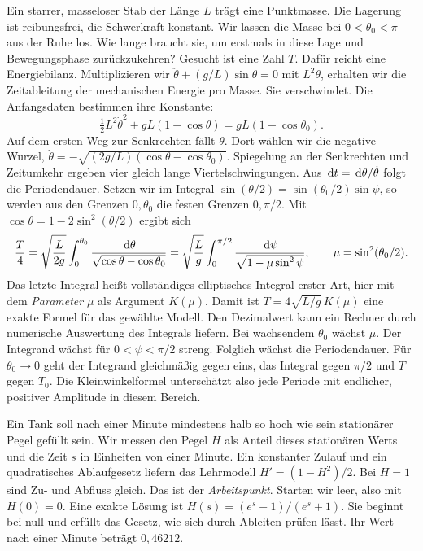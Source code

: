 Ein starrer, masseloser Stab der Länge \(L\) trägt eine Punktmasse. Die Lagerung ist reibungsfrei, die Schwerkraft konstant. Wir lassen die Masse bei \(0<\theta_0<\pi\) aus der Ruhe los. Wie lange braucht sie, um erstmals in diese Lage und Bewegungsphase zurückzukehren? Gesucht ist eine Zahl \(T\). Dafür reicht eine Energiebilanz.
Multiplizieren wir \(\ddot\theta+(g/L)\sin\theta=0\) mit \(L^2\dot\theta\), erhalten wir die Zeitableitung der mechanischen Energie pro Masse. Sie verschwindet. Die Anfangsdaten bestimmen ihre Konstante:
\[
 \tfrac12 L^2\dot\theta^2+gL(1-\cos\theta)=gL(1-\cos\theta_0).
\]
Auf dem ersten Weg zur Senkrechten fällt \(\theta\). Dort wählen wir die negative Wurzel, \(\dot\theta=-\sqrt{(2g/L)(\cos\theta-\cos\theta_0)}\). Spiegelung an der Senkrechten und Zeitumkehr ergeben vier gleich lange Viertelschwingungen.
Aus \(\,\mathrm{d} t=\,\mathrm{d}\theta/\dot\theta\) folgt die Periodendauer. Setzen wir im Integral \(\sin(\theta/2)=\sin(\theta_0/2)\sin\psi\), so werden aus den Grenzen \(0,\theta_0\) die festen Grenzen \(0,\pi/2\). Mit \(\cos\theta=1-2\sin^2(\theta/2)\) ergibt sich
\[
 \frac{T}{4}=\sqrt{\frac{L}{2g}}\int_0^{\theta_0}
 \frac{\,\mathrm{d}\theta}{\sqrt{\cos\theta-\cos\theta_0}}
 =\sqrt{\frac{L}{g}}\int_0^{\pi/2}\frac{\,\mathrm{d}\psi}{\sqrt{1-\mu\sin^2\psi}},
 \qquad \mu=\sin^2(\theta_0/2).
\]
Das letzte Integral heißt vollständiges elliptisches Integral erster Art, hier mit dem \emph{Parameter} \(\mu\) als Argument \(K(\mu)\). Damit ist \(T=4\sqrt{L/g}\,K(\mu)\) eine exakte Formel für das gewählte Modell. Den Dezimalwert kann ein Rechner durch numerische Auswertung des Integrals liefern.
Bei wachsendem \(\theta_0\) wächst \(\mu\). Der Integrand wächst für \(0<\psi<\pi/2\) streng. Folglich wächst die Periodendauer. Für \(\theta_0\to0\) geht der Integrand gleichmäßig gegen eins, das Integral gegen \(\pi/2\) und \(T\) gegen \(T_0\). Die Kleinwinkelformel unterschätzt also jede Periode mit endlicher, positiver Amplitude in diesem Bereich.

\clearpage{}
Ein Tank soll nach einer Minute mindestens halb so hoch wie sein stationärer Pegel gefüllt sein. Wir messen den Pegel \(H\) als Anteil dieses stationären Werts und die Zeit \(s\) in Einheiten von einer Minute. Ein konstanter Zulauf und ein quadratisches Ablaufgesetz liefern das Lehrmodell \(H'=(1-H^2)/2\). Bei \(H=1\) sind Zu- und Abfluss gleich. Das ist der \emph{Arbeitspunkt}.
Starten wir leer, also mit \(H(0)=0\). Eine exakte Lösung ist \(H(s)=(e^s-1)/(e^s+1)\). Sie beginnt bei null und erfüllt das Gesetz, wie sich durch Ableiten prüfen lässt. Ihr Wert nach einer Minute beträgt \(0{,}46212\).

